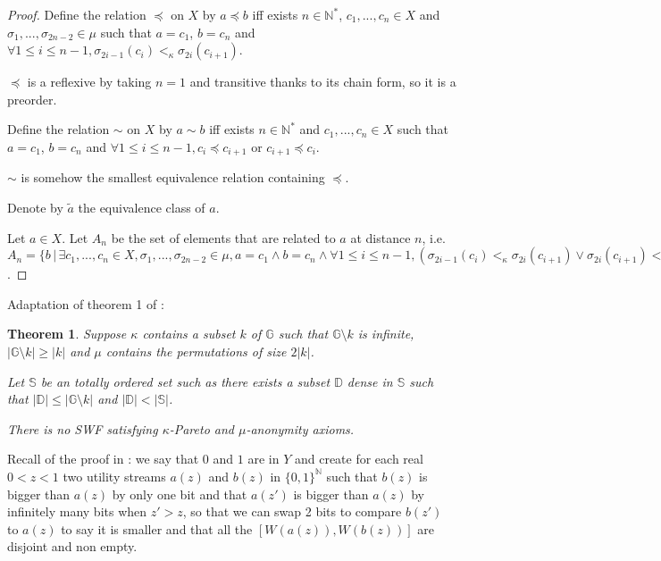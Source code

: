 \documentclass{article}
\newcommand{\G}{\mathbb{G}}
\newcommand{\D}{\mathbb{D}}
\newtheorem{theorem}{Theorem}
\begin{document}
\begin{proof}
  Define the relation $\preceq$ on $X$ by $a\preceq b$ iff exists $n\in\mathbb N^*$, $c_1,...,c_n\in X$ and
  $\sigma_1,...,\sigma_{2n-2}\in\mu$ such that $a=c_1$, $b=c_n$ and $\forall 1\leq i\leq n-1, \sigma_{2i-1}(c_i)<_\kappa\sigma_{2i}(c_{i+1})$.

  $\preceq$ is a reflexive by taking $n=1$ and transitive thanks to its chain form,
  so it is a preorder. \medskip

  Define the relation $\sim$ on $X$ by $a\sim b$ iff exists $n\in\mathbb N^*$ and $c_1,...,c_n\in X$
  such that $a=c_1$, $b=c_n$ and $\forall 1\leq i\leq n-1, c_i\preceq c_{i+1}$ or $c_{i+1}\preceq c_i$.

  $\sim$ is somehow the smallest equivalence relation containing $\preceq$.

  Denote by $\tilde{a}$ the equivalence class of $a$. \medskip

  Let $a\in X$. Let $A_n$ be the set of elements that are related to $a$ at distance
  $n$, i.e. $A_n=\{b\,|\, \exists c_1,...,c_n\in X, \sigma_1,...,\sigma_{2n-2}\in\mu, a=c_1 \wedge b=c_n \wedge \forall 1\leq i\leq n-1, \left(\sigma_{2i-1}(c_i)<_\kappa\sigma_{2i}(c_{i+1}) \vee \sigma_{2i}(c_{i+1})<_\kappa\sigma_{2i-1}(c_i)\right)\}$.
\end{proof}


\medskip
Adaptation of theorem 1 of \cite{basumitra03}:
\begin{theorem}
  Suppose $\kappa$ contains a subset $k$ of $\G$ such that $\mathbb G\setminus k$ is infinite,
  $|\mathbb G\setminus k|\geq |k|$ and $\mu$ contains the permutations of size $2|k|$.

  Let $\mathbb S$ be an totally ordered set such as there exists a subset $\D$ dense in
  $\mathbb S$ such that $|\D|\leq |\G\setminus k|$ and $|\D|<|\mathbb S|$.

  There is no SWF satisfying $\kappa$-Pareto and $\mu$-anonymity axioms.
\end{theorem}

Recall of the proof in \cite{basumitra03} : we say that $0$ and $1$ are in $Y$ and
create for each real $0<z<1$ two utility streams $a(z)$ and $b(z)$ in
$\{0,1\}^{\mathbb N}$ such that $b(z)$ is bigger than $a(z)$ by only one bit and
that $a(z')$ is bigger than $a(z)$ by infinitely many bits when $z'>z$, so that we
can swap 2 bits to compare $b(z')$ to $a(z)$ to say it is smaller and that all the
$[W(a(z)),W(b(z))]$ are disjoint and non empty.
\end{document}
